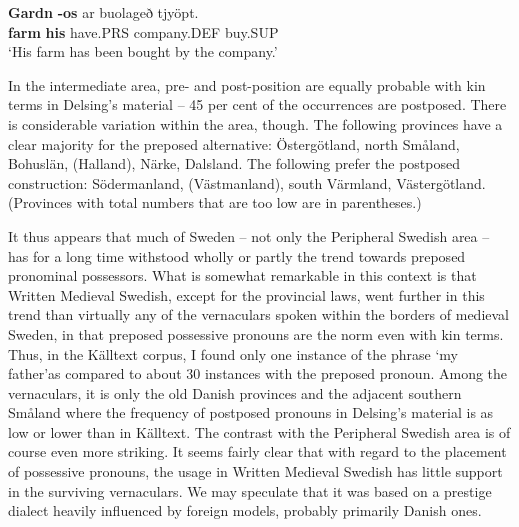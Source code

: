 

 \ea\label{}
\gll \textbf{Gardn}\textbf{  {}-os} ar  buolageð  tjyöpt.\\


\textbf{farm} \textbf{his} have.PRS  company.DEF  buy.SUP\\

\glt ‘His farm has been bought by the company.’

\z

In the intermediate area, pre- and post-position are equally probable with kin terms in Delsing’s material – 45 per cent of the occurrences are postposed. There is considerable variation within the area, though. The following provinces have a clear majority for the preposed alternative: Östergötland, north Småland, Bohuslän, (Halland), Närke, Dalsland. The following prefer the postposed construction: Södermanland, (Västmanland), south Värmland, Västergötland. (Provinces with total numbers that are too low are in parentheses.)


It thus appears that much of Sweden – not only the Peripheral Swedish area – has for a long time withstood wholly or partly the trend towards preposed pronominal possessors. What is somewhat remarkable in this context is that Written Medieval Swedish, except for the provincial laws, went further in this trend than virtually any of the vernaculars spoken within the borders of medieval Sweden, in that preposed possessive pronouns are the norm even with kin terms. Thus, in the Källtext corpus, I found only one instance of the phrase ‘my father’\textstyleLinguisticExample{ }as compared to about 30 instances with the preposed pronoun. Among the vernaculars, it is only the old Danish provinces and the adjacent southern Småland where the frequency of postposed pronouns in Delsing’s material is as low or lower than in Källtext. The contrast with the Peripheral Swedish area is of course even more striking. It seems fairly clear that with regard to the placement of possessive pronouns, the usage in Written Medieval Swedish has little support in the surviving vernaculars. We may speculate that it was based on a prestige dialect heavily influenced by foreign models, probably primarily Danish ones.

